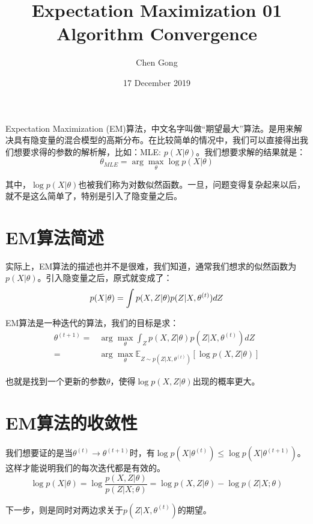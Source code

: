 \documentclass[a4paper]{article}
\title{Expectation Maximization 01 Algorithm Convergence}
\author{Chen Gong}
\date{17 December 2019}
\begin{document}
\maketitle
Expectation Maximization (EM)算法，中文名字叫做“期望最大”算法。是用来解决具有隐变量的混合模型的高斯分布。在比较简单的情况中，我们可以直接得出我们想要求得的参数的解析解，比如：MLE: $p(X|\theta)$。我们想要求解的结果就是：
\begin{equation}
    \theta_{MLE} = \arg\max_{\theta}\log p(X|\theta)
\end{equation}

其中，$\log p(X|\theta)$也被我们称为对数似然函数。一旦，问题变得复杂起来以后，就不是这么简单了，特别是引入了隐变量之后。

\section{EM算法简述}
实际上，EM算法的描述也并不是很难，我们知道，通常我们想求的似然函数为$p(X|\theta)$。引入隐变量之后，原式就变成了：
\begin{equation}
    p(X|\theta) = \int p(X,Z|\theta)p(Z|X,\theta^{(t)})dZ \\
\end{equation}

EM算法是一种迭代的算法，我们的目标是求：
\begin{equation}
    \begin{split}
        \theta^{(t+1)} = &\arg\max_{\theta} \int_Z
        p(X,Z|\theta)p(Z|X,\theta^{(t)})dZ \\
        = &\arg\max_{\theta} \mathbb{E}_{Z \sim p(Z|X,\theta^{(t)})}[\log p(X,Z|\theta)]
    \end{split}
\end{equation}

也就是找到一个更新的参数$\theta$，使得$\log p(X,Z|\theta)$出现的概率更大。

\section{EM算法的收敛性}
我们想要证的是当$\theta^{(t)} \longrightarrow \theta^{(t+1)}$时，有$\log p(X|\theta^{(t)}) \leq \log p(X|\theta^{(t+1)})$。这样才能说明我们的每次迭代都是有效的。
\begin{equation}
    \log p(X|\theta) = \log \frac{p(X,Z|\theta)}{ p(Z|X;\theta)} = \log p(X,Z|\theta) - \log p(Z|X;\theta)
\end{equation}

下一步，则是同时对两边求关于$p(Z|X,\theta^{(t)})$的期望。
\end{document}
